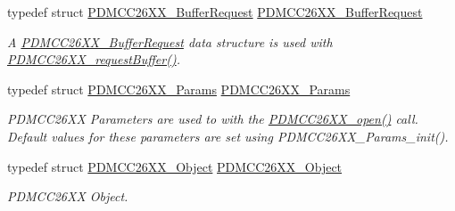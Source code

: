 \begin{DoxyCompactItemize}
typedef struct \hyperlink{struct_p_d_m_c_c26_x_x___buffer_request}{P\+D\+M\+C\+C26\+X\+X\+\_\+\+Buffer\+Request} \hyperlink{_p_d_m_c_c26_x_x_8h_ae8cebf1f4b5897234e3be6744eb26997}{P\+D\+M\+C\+C26\+X\+X\+\_\+\+Buffer\+Request}
\begin{DoxyCompactList}\small\item\em A \hyperlink{struct_p_d_m_c_c26_x_x___buffer_request}{P\+D\+M\+C\+C26\+X\+X\+\_\+\+Buffer\+Request} data structure is used with \hyperlink{_p_d_m_c_c26_x_x_8h_a15a0017513c13ca244f7e3a0f5761e8d}{P\+D\+M\+C\+C26\+X\+X\+\_\+request\+Buffer()}. \end{DoxyCompactList}\item 
typedef struct \hyperlink{struct_p_d_m_c_c26_x_x___params}{P\+D\+M\+C\+C26\+X\+X\+\_\+\+Params} \hyperlink{_p_d_m_c_c26_x_x_8h_a31104648f1849f5eef36ef1d98465a6b}{P\+D\+M\+C\+C26\+X\+X\+\_\+\+Params}
\begin{DoxyCompactList}\small\item\em P\+D\+M\+C\+C26\+X\+X Parameters are used to with the \hyperlink{_p_d_m_c_c26_x_x_8h_a431d9b71e0d0eebd5ab85960f1c82ee0}{P\+D\+M\+C\+C26\+X\+X\+\_\+open()} call. Default values for these parameters are set using P\+D\+M\+C\+C26\+X\+X\+\_\+\+Params\+\_\+init(). \end{DoxyCompactList}\item 
typedef struct \hyperlink{struct_p_d_m_c_c26_x_x___object}{P\+D\+M\+C\+C26\+X\+X\+\_\+\+Object} \hyperlink{_p_d_m_c_c26_x_x_8h_a8faebd80770af564015834b59c2d3414}{P\+D\+M\+C\+C26\+X\+X\+\_\+\+Object}
\begin{DoxyCompactList}\small\item\em P\+D\+M\+C\+C26\+X\+X Object. \end{DoxyCompactList}\end{DoxyCompactItemize}
